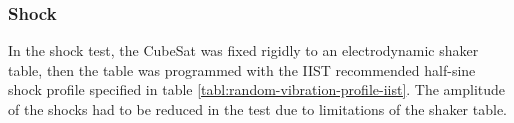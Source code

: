 \documentclass{report}
\begin{document}





\subsubsection{Shock}

In the shock test, the CubeSat was fixed rigidly to an electrodynamic shaker table, then the table was programmed with the IIST recommended half-sine shock profile specified in table \ref{tabl:random-vibration-profile-iist}. The amplitude of the shocks had to be reduced in the test due to limitations of the shaker table.
\end{document}
